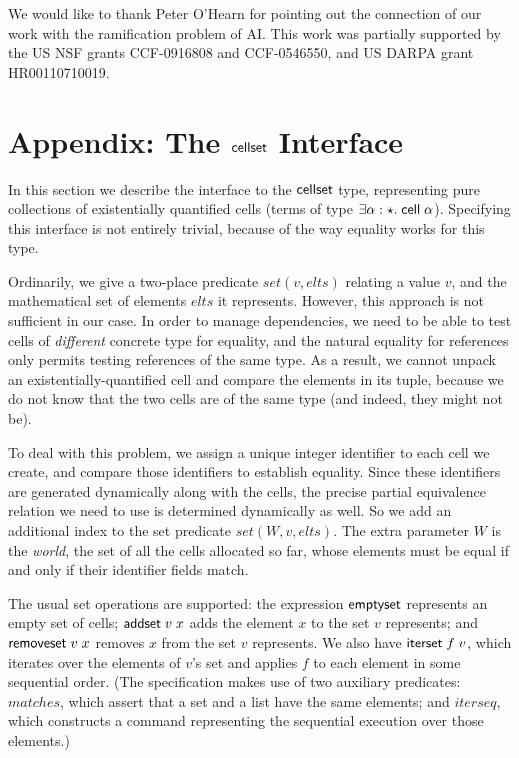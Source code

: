 \documentclass[natbib]{sigplanconf}
\begin{document}
\acks We would like to thank Peter O'Hearn for pointing out the connection
of our work with the ramification problem of AI. This work was
partially supported by the US NSF grants CCF-0916808 and CCF-0546550,
and US DARPA grant HR00110710019.

{}


% 
% 
% 
% 

\appendix

\section{Appendix: The $\mbox{\textsf{{cellset}}}$ Interface}

In this section we describe the interface to the $\mbox{\textsf{{cellset}}}$ type,
representing pure collections of existentially quantified cells
(terms of type $\exists \alpha:\star.\;
\mbox{\textsf{{cell}}}\;{\alpha}$). Specifying this interface is not entirely
trivial, because of the way equality works for this type. 

Ordinarily, we give a two-place predicate $set(v, elts)$ relating a
value $v$, and the mathematical set of elements $elts$ it represents.
However, this approach is not sufficient in our case. In order to
manage dependencies, we need to be able to test cells of
\emph{different} concrete type for equality, and the natural equality
for references only permits testing references of the same type. As a
result, we cannot unpack an existentially-quantified cell and compare
the elements in its tuple, because we do not know that the two cells
are of the same type (and indeed, they might not be). 

To deal with this problem, we assign a unique integer identifier to
each cell we create, and compare those identifiers to establish
equality. Since these identifiers are generated dynamically along with
the cells, the precise partial equivalence relation we need to use is
determined dynamically as well. So we add an additional index to the
set predicate $set(W, v, elts)$. The extra parameter $W$ is the
\emph{world}, the set of all the cells allocated so far, whose
elements must be equal if and only if their identifier fields match.

The usual set operations are supported: the expression
$\mbox{\textsf{{emptyset}}}$ represents an empty set of cells; 
$\mbox{\textsf{{addset}}}\;v\;x$ adds the element $x$ to the set $v$
represents; and $\mbox{\textsf{{removeset}}}\;v\;x$ removes $x$ from the
set $v$ represents. We also have $\mbox{\textsf{{iterset}}}\;f\;v$, which
iterates over the elements of $v$'s set and applies $f$ to each
element in some sequential order. (The specification
makes use of two auxiliary predicates: $\mathit{matches}$, which assert that a
set and a list have the same elements; and $\mathit{iterseq}$, which constructs
a command representing the sequential execution over those elements.)
\end{document}
